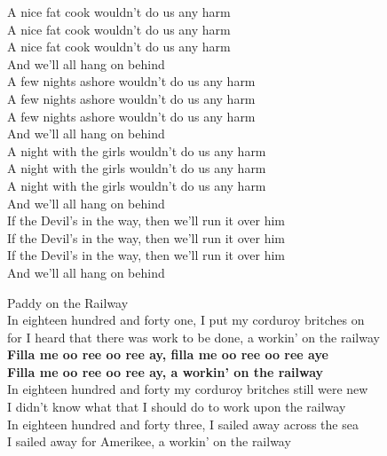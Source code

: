 \documentclass[letterpaper,9pt]{article}
\begin{document}
A nice fat cook wouldn't do us any harm \\
A nice fat cook wouldn't do us any harm \\
A nice fat cook wouldn't do us any harm \\
And we'll all hang on behind \\

A few nights ashore wouldn't do us any harm \\
A few nights ashore wouldn't do us any harm \\
A few nights ashore wouldn't do us any harm \\
And we'll all hang on behind \\

A night with the girls wouldn't do us any harm \\
A night with the girls wouldn't do us any harm \\
A night with the girls wouldn't do us any harm \\
And we'll all hang on behind \\

If the Devil's in the way, then we'll run it over him \\
If the Devil's in the way, then we'll run it over him \\
If the Devil's in the way, then we'll run it over him \\
And we'll all hang on behind \\

\newpage
{}
\Huge
Paddy on the Railway\\

\LARGE
In eighteen hundred and forty one, I put my corduroy britches on \\
for I heard that there was work to be done, a workin' on the railway \\

\textbf{Filla me oo ree oo ree ay, filla me oo ree oo ree aye \\
Filla me oo ree oo ree ay, a workin' on the railway} \\

In eighteen hundred and forty my corduroy britches still were new \\
I didn't know what that I should do to work upon the railway \\

In eighteen hundred and forty three, I sailed away across the sea \\
I sailed away for Amerikee, a workin' on the railway \\
\end{document}
